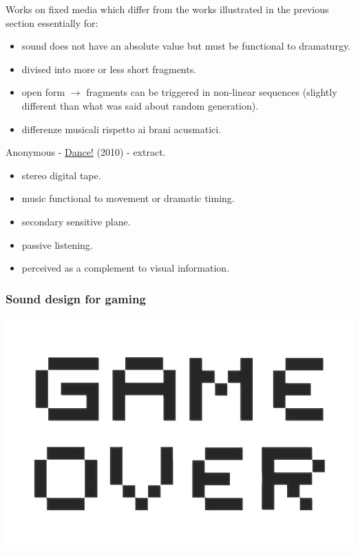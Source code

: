Works on fixed media which differ from the works illustrated in the previous section essentially for:

\begin{itemize}
\tightlist
\item sound does not have an absolute value but must be functional to dramaturgy.
\item divised into more or less short fragments.
\item open form \(\rightarrow\) fragments can be triggered in non-linear sequences (slightly different than what was said about random generation).
\item differenze musicali rispetto ai brani acusmatici.
\end{itemize}

Anonymous - \href{http://www.musicaecodice.it/gitmedia/emc/2_media/dance.mp3}{Dance!} (2010) - extract.

\begin{itemize}
\tightlist 
\item stereo digital tape. 
\item music functional to movement or dramatic timing.
\item secondary sensitive plane. 
\item passive listening. 
\item perceived as a complement to visual information.
\end{itemize}

\subsubsection{Sound design for gaming}\label{sound-design-for-gaming}

\begin{center}
\includegraphics[scale=0.3]{../img/game.png}
\end{center}


